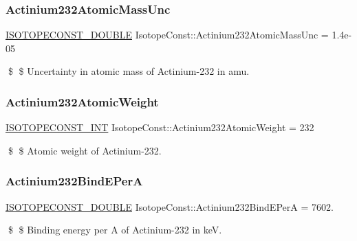 \subsubsection{\texorpdfstring{Actinium232\+Atomic\+Mass\+Unc}{Actinium232AtomicMassUnc}}
{\footnotesize\ttfamily \mbox{\hyperlink{group___isotope_const-_macros_ga8f45a7272ce02c0b4c65c44636ed719a}{I\+S\+O\+T\+O\+P\+E\+C\+O\+N\+S\+T\+\_\+\+D\+O\+U\+B\+LE}} Isotope\+Const\+::\+Actinium232\+Atomic\+Mass\+Unc = 1.\+4e-\/05}

\$ \$ Uncertainty in atomic mass of Actinium-\/232 in amu. \mbox{\label{group___isotope_const-_actinium-_ac232_ga5e67d5f74e77399ea3fb6b6c6ec71422}} 
\subsubsection{\texorpdfstring{Actinium232\+Atomic\+Weight}{Actinium232AtomicWeight}}
{\footnotesize\ttfamily \mbox{\hyperlink{group___isotope_const-_macros_ga5f18360b3e99483a35c32d789e62621c}{I\+S\+O\+T\+O\+P\+E\+C\+O\+N\+S\+T\+\_\+\+I\+NT}} Isotope\+Const\+::\+Actinium232\+Atomic\+Weight = 232}

\$ \$ Atomic weight of Actinium-\/232. \mbox{\label{group___isotope_const-_actinium-_ac232_ga35cd67c3f390d7c91aa67f56e5e66d79}} 
\subsubsection{\texorpdfstring{Actinium232\+Bind\+E\+PerA}{Actinium232BindEPerA}}
{\footnotesize\ttfamily \mbox{\hyperlink{group___isotope_const-_macros_ga8f45a7272ce02c0b4c65c44636ed719a}{I\+S\+O\+T\+O\+P\+E\+C\+O\+N\+S\+T\+\_\+\+D\+O\+U\+B\+LE}} Isotope\+Const\+::\+Actinium232\+Bind\+E\+PerA = 7602.}

\$ \$ Binding energy per A of Actinium-\/232 in keV. \mbox{\label{group___isotope_const-_actinium-_ac232_ga2421ec76596f00f480be91c70aefa384}} 
